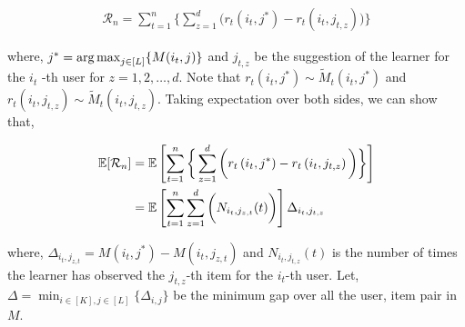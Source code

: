 \begin{align*}
\mathcal{R}_n = \sum_{t=1}^{n}\bigg\lbrace \sum_{z=1}^{d} \bigg( r_{t}\left(i_{t}, j^* \right) - r_{t}\left( i_{t}, j_{t,z}\right)\bigg)\bigg\rbrace
\end{align*}

where, $j^* = \mathop{\rm arg\,max}_{j\in [L]}\lbrace M(i_t,j)\rbrace$ and $j_{t,z}$ be the suggestion of the learner for the $i_t$ -th user for  $z=1,2,\ldots, d$. Note that $r_{t}\left(i_t, j^* \right)\sim \tilde{M}_t\left(i_t, j^*\right)$ and $r_{t}\left(i_t, j_{t,z} \right)\sim \tilde{M}_t\left(i_t, j_{t,z} \right)$. Taking expectation over both sides, we can show that,

\begin{align*}
\mathbb{E}[\mathcal{R}_n] & = \mathbb{E}\left [ \sum_{t=1}^{n}\bigg\lbrace\sum_{z=1}^{d} \bigg( r_{t}\left(i_t, j^* \right) - r_{t}\left( i_t, j_{t,z}\right)\bigg)\bigg\rbrace\right] \\
&= \mathbb{E}\left [ \sum_{t=1}^{n} \sum_{z=1}^{d} \bigg( N_{i_t,j_{z,t}}(t)\bigg) \right ]\Delta_{i_t,j_{t,z}}
\end{align*}

where, $\Delta_{i_t,j_{z,t}} = M(i_t,j^*) - M(i_t,j_{z,t})$ and $N_{i_t,j_{t,z}}(t)$ is the number of times the learner has observed the $j_{t,z}$-th item for the $i_t$-th user. Let, $\Delta = \min_{i\in[K],j\in[L]}\lbrace \Delta_{i,j}\rbrace$ be the minimum gap over all the user, item pair in $M$.
